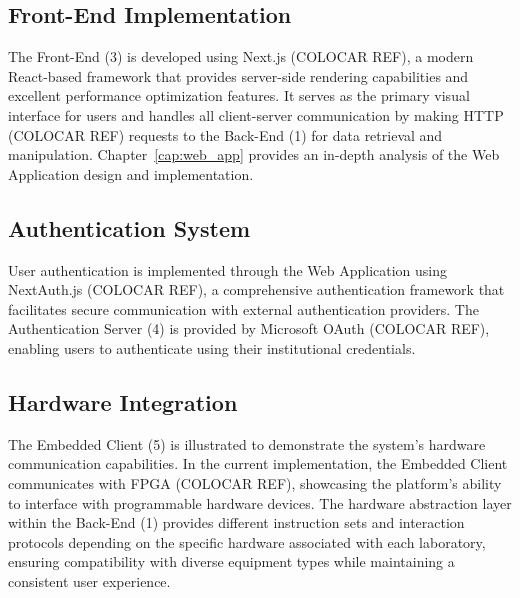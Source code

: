 \subsection*{Front-End Implementation}
The Front-End (3) is developed using Next.js (COLOCAR REF), a modern React-based framework that provides server-side rendering capabilities and excellent performance optimization features. It serves as the primary visual interface for users and handles all client-server communication by making HTTP (COLOCAR REF) requests to the Back-End (1) for data retrieval and manipulation. Chapter~\ref{cap:web_app} provides an in-depth analysis of the Web Application design and implementation.

\subsection*{Authentication System}
User authentication is implemented through the Web Application using NextAuth.js (COLOCAR REF), a comprehensive authentication framework that facilitates secure communication with external authentication providers. The Authentication Server (4) is provided by Microsoft OAuth (COLOCAR REF), enabling users to authenticate using their institutional credentials.

\subsection*{Hardware Integration}
The Embedded Client (5) is illustrated to demonstrate the system's hardware communication capabilities. In the current implementation, the Embedded Client communicates with FPGA (COLOCAR REF), showcasing the platform's ability to interface with programmable hardware devices. The hardware abstraction layer within the Back-End (1) provides different instruction sets and interaction protocols depending on the specific hardware associated with each laboratory, ensuring compatibility with diverse equipment types while maintaining a consistent user experience.